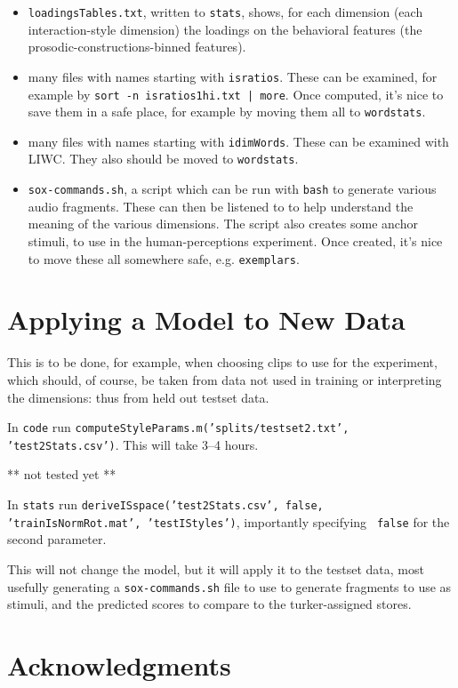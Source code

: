 \documentclass[11pt]{article}
\begin{document}
\begin{itemize}   \setlength{\itemsep}{0pt}\setlength{\parskip}{0pt}
\item {\tt loadingsTables.txt}, written to {\tt stats}, shows, for each
  dimension (each interaction-style dimension) the loadings on the
  behavioral features (the prosodic-constructions-binned features).
\item many files with names starting with {\tt isratios}.  These can
  be examined, for example by {\tt sort -n isratios1hi.txt | more}.
  Once computed, it's nice to save them in a safe place, for example
  by moving them all to {\tt wordstats}. 
\item many files with names starting with {\tt idimWords}.  These can
  be examined with LIWC.  They also should be moved to {\tt wordstats}.
\item {\tt sox-commands.sh}, a script which can be run with {\tt bash}
  to generate various audio fragments.  These can then be listened to
  to help understand the meaning of the various dimensions.  The
  script also creates some anchor stimuli, to use in the
  human-perceptions experiment.  Once created, it's nice to move these
  all somewhere safe, e.g. {\tt exemplars}.
\end{itemize}

\section{Applying a Model to New Data}

This is to be done, for example, when choosing clips to use for the
experiment, which should, of course, be taken from data not used in
training or interpreting the dimensions: thus from held out testset
data.

In {\tt code} run {\tt computeStyleParams.m('splits/testset2.txt',
  'test2Stats.csv')}.  This will take  3--4 hours.

** not tested yet **

In {\tt stats} run {\tt deriveISspace('test2Stats.csv', false,
  'trainIsNormRot.mat', 'testIStyles')}, importantly specifying {\tt
  false} for the second parameter.

This will not change the model, but it will apply it to the testset
data, most usefully generating a {\tt sox-commands.sh} file to use to
generate fragments to use as stimuli, and the predicted scores to
compare to the turker-assigned stores. 


\section{Acknowledgments }  



%

\end{document}
